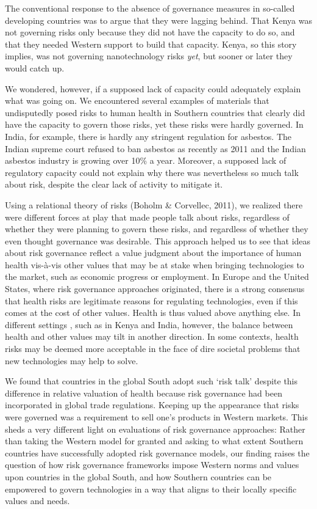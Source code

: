 \documentclass[authordate, empirical]{jote-new-article}
\begin{document}
	The conventional response to the absence of governance measures in so-called developing countries was to argue that they were lagging behind. That Kenya was not governing risks only because they did not have the capacity to do so, and that they needed Western support to build that capacity. Kenya, so this story implies, was not governing nanotechnology risks \emph{yet}, but sooner or later they would catch up.



	We wondered, however, if a supposed lack of capacity could adequately explain what was going on. We encountered several examples of materials that undisputedly posed risks to human health in Southern countries that clearly did have the capacity to govern those risks, yet these risks were hardly governed. In India, for example, there is hardly any stringent regulation for asbestos. The Indian supreme court refused to ban asbestos as recently as 2011 and the Indian asbestos industry is growing over 10\% a year. Moreover, a supposed lack of regulatory capacity could not explain why there was nevertheless so much talk about risk, despite the clear lack of activity to mitigate it.



	Using a relational theory of risks (Boholm \& Corvellec, 2011), we realized there were different forces at play that made people talk about risks, regardless of whether they were planning to govern these risks, and regardless of whether they even thought governance was desirable. This approach helped us to see that ideas about risk governance reflect a value judgment about the importance of human health vis-à-vis other values that may be at stake when bringing technologies to the market, such as economic progress or employment. In Europe and the United States, where risk governance approaches originated, there is a strong consensus that health risks are legitimate reasons for regulating technologies, even if this comes at the cost of other values. Health is thus valued above anything else. In different settings , such as in Kenya and India, however, the balance between health and other values may tilt in another direction. In some contexts, health risks may be deemed more acceptable in the face of dire societal problems that new technologies may help to solve.



	We found that countries in the global South adopt such ‘risk talk' despite this difference in relative valuation of health because risk governance had been incorporated in global trade regulations. Keeping up the appearance that risks were governed was a requirement to sell one's products in Western markets. This sheds a very different light on evaluations of risk governance approaches: Rather than taking the Western model for granted and asking to what extent Southern countries have successfully adopted risk governance models, our finding raises the question of how risk governance frameworks impose Western norms and values upon countries in the global South, and how Southern countries can be empowered to govern technologies in a way that aligns to their locally specific values and needs.
\end{document}
